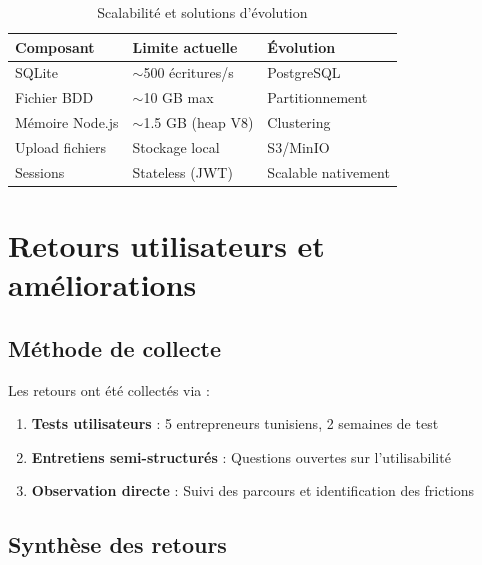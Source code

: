 \begin{table}[H]
\centering
\caption{Scalabilité et solutions d'évolution}
\label{tab:scalability}
\begin{tabular}{|l|l|l|}
\hline
\textbf{Composant} & \textbf{Limite actuelle} & \textbf{Évolution} \\
\hline
SQLite & $\sim$500 écritures/s & PostgreSQL \\
\hline
Fichier BDD & $\sim$10 GB max & Partitionnement \\
\hline
Mémoire Node.js & $\sim$1.5 GB (heap V8) & Clustering \\
\hline
Upload fichiers & Stockage local & S3/MinIO \\
\hline
Sessions & Stateless (JWT) & Scalable nativement \\
\hline
\end{tabular}
\end{table}

\section{Retours utilisateurs et améliorations}

\subsection{Méthode de collecte}

Les retours ont été collectés via :
\begin{enumerate}
    \item \textbf{Tests utilisateurs} : 5 entrepreneurs tunisiens, 2 semaines de test
    \item \textbf{Entretiens semi-structurés} : Questions ouvertes sur l'utilisabilité
    \item \textbf{Observation directe} : Suivi des parcours et identification des frictions
\end{enumerate}

\subsection{Synthèse des retours}

